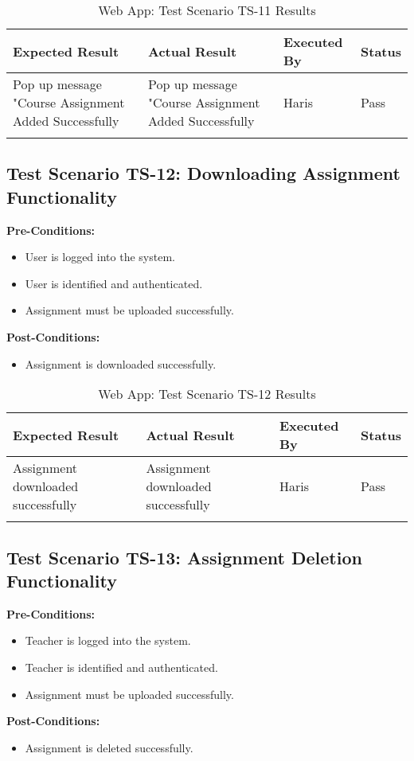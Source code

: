 \begin{longtable}{|p{4cm}|p{4cm}|p{2cm}|p{2cm}|}
\hline
\textbf{Expected Result} & \textbf{Actual Result} & \textbf{Executed By} & \textbf{Status}\\
\hline
Pop up message "Course Assignment Added Successfully &
Pop up message "Course Assignment Added Successfully &
Haris &
Pass \\
\hline

\caption{Web App: Test Scenario TS-11 Results}
\end{longtable}



\subsection{Test Scenario TS-12: Downloading Assignment Functionality}

\textbf{Pre-Conditions: }
\begin{itemize}

\item User is logged into the system.
\item User is identified and authenticated.
\item Assignment must be uploaded successfully.

\end{itemize}
\textbf{Post-Conditions: }
\begin{itemize}
\item Assignment is downloaded successfully.
\end{itemize}


\bigskip

\begin{longtable}{|p{4cm}|p{4cm}|p{2cm}|p{2cm}|}
\hline
\textbf{Expected Result} & \textbf{Actual Result} & \textbf{Executed By} & \textbf{Status}\\
\hline
Assignment downloaded successfully &
Assignment downloaded successfully &
Haris &
Pass \\
\hline

\caption{Web App: Test Scenario TS-12 Results}
\end{longtable}


\subsection{Test Scenario TS-13: Assignment Deletion Functionality}

\textbf{Pre-Conditions: }
\begin{itemize}

\item Teacher is logged into the system.
\item Teacher is identified and authenticated.
\item Assignment must be uploaded successfully.

\end{itemize}
\textbf{Post-Conditions: }
\begin{itemize}
\item Assignment is deleted successfully.
\end{itemize}


